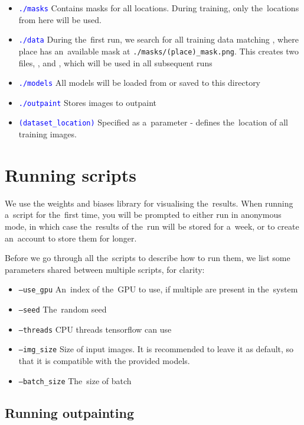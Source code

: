 \begin{itemize}
    \item \textcolor{blue}{\texttt{./masks}} Contains masks for all locations. During training, only the~locations from here will be used.
    \item \textcolor{blue}{\texttt{./data}} During the~first run, we search for all training data matching , where place has an~available mask at \texttt{./masks/(place)\_mask.png}. This creates two files, , and , which will be used in all subsequent runs
    \item \textcolor{blue}{\texttt{./models}} All models will be loaded from or saved to this directory
    \item \textcolor{blue}{\texttt{./outpaint}} Stores images to outpaint
    \item \textcolor{blue}{\texttt{(dataset\_location)}} Specified as a~parameter - defines the~location of all training images.
\end{itemize}


\section{Running scripts}

We use the weights and biases library \citep{wandb} for visualising the~results. When running a~script for the~first time, you will be prompted to either run in anonymous mode, in which case the~results of the~run will be stored for a~week, or to create an~account to store them for longer. 

Before we go through all the~scripts to describe how to run them, we list some parameters shared between multiple scripts, for clarity:
\begin{itemize}
    \item \texttt{--use\_gpu} An~index of the~GPU to use, if multiple are present in the~system
    \item \texttt{--seed} The~random seed
    \item \texttt{--threads} CPU threads tensorflow can use
    \item \texttt{--img\_size} Size of input images. It is recommended to leave it as default, so that it is compatible with the provided models.
    \item \texttt{--batch\_size} The~size of batch
\end{itemize}



\subsection{Running outpainting}



